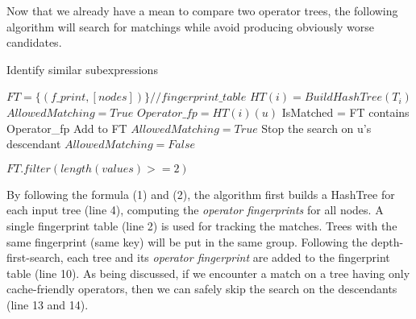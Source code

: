 Now that we already have a mean to compare two operator trees, the following algorithm will search for matchings while avoid producing obviously worse candidates.


\begin{algorithm}
\caption{Identify similar subexpressions}\label{sec:common_sub_alg}
\begin{algorithmic}[1]
\State $FT = \{(f\_print, [nodes])\} //fingerprint\_table$ 
	\State$HT(i) = BuildHashTree(T_{i})$
	\State $AllowedMatching = True$	
		\State $Operator\_fp = HT(i)(u)$
		\State IsMatched = FT contains Operator\_fp
				\State Add to FT
		\EndIf
		\State $AllowedMatching = True$	
			\State Stop the search on u's descendant
			\State $AllowedMatching = False$	
		\EndIf		
	\EndFor
	
\EndFor

\State \Return $FT.filter(length(values) >= 2)$
\EndProcedure
\end{algorithmic}
\end{algorithm}

By following the formula (1) and (2), the algorithm first builds a HashTree for each input tree (line 4), computing the \emph{operator fingerprints} for all nodes. A single fingerprint table (line 2) is used for tracking the matches. Trees with the same fingerprint (same key) will be put in the same group. Following the depth-first-search, each tree and its \emph{operator fingerprint} are added to the fingerprint table (line 10). As being discussed, if we encounter a match on a tree having only cache-friendly operators, then we can safely skip the search on the descendants (line 13 and 14).